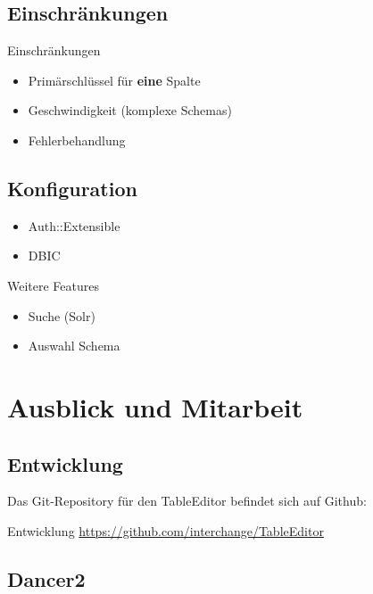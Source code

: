\subsection{Einschränkungen}
\begin{frame}{Einschränkungen}
\begin{itemize}
\item Primärschlüssel für \textbf{eine} Spalte
\item Geschwindigkeit (komplexe Schemas)
\item Fehlerbehandlung
\end{itemize}
\end{frame}

\subsection{Konfiguration}
\begin{frame}
\begin{itemize}
\item Auth::Extensible
\item DBIC
\end{itemize}
\end{frame}

\begin{frame}{Weitere Features}
\begin{itemize}
\item Suche (Solr)
\item Auswahl Schema
\end{itemize}
\end{frame}

\section{Ausblick und Mitarbeit}

\subsection{Entwicklung}

Das Git-Repository für den TableEditor befindet sich auf Github:

\begin{frame}{Entwicklung}
\url{https://github.com/interchange/TableEditor}
\end{frame}

\subsection{Dancer2}


